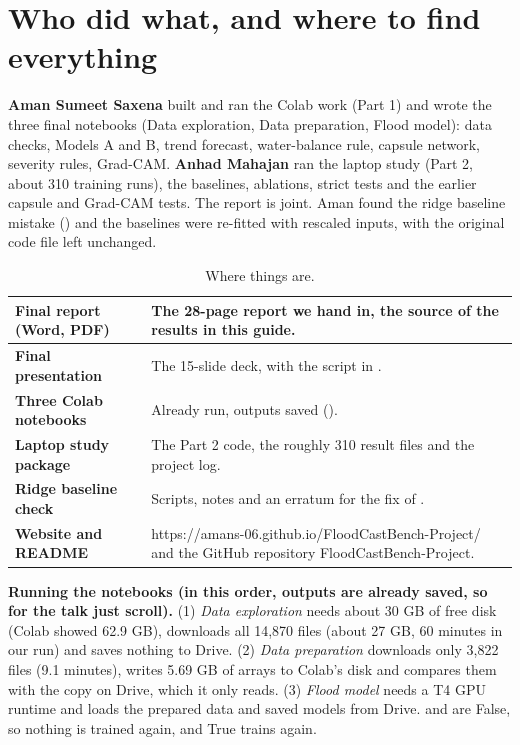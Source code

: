 \section{Who did what, and where to find everything}\label{ch:who}
\textbf{Aman Sumeet Saxena} built and ran the Colab work (Part 1) and wrote the three final notebooks (Data exploration, Data preparation, Flood model): data checks, Models A and B, trend forecast, water-balance rule, capsule network, severity rules, Grad-CAM. \textbf{Anhad Mahajan} ran the laptop study (Part 2, about 310 training runs), the baselines, ablations, strict tests and the earlier capsule and Grad-CAM tests. The report is joint. Aman found the ridge baseline mistake () and the baselines were re-fitted with rescaled inputs, with the original code file left unchanged.

\begin{table}[!htbp]
\centering\footnotesize
\caption{Where things are.}
\begin{tabularx}{\linewidth}{|>{\bfseries}p{3.6cm}|Y|}
\hline
Final report (Word, PDF) & The 28-page report we hand in, the source of the results in this guide.\\ \hline
Final presentation & The 15-slide deck, with the script in .\\ \hline
Three Colab notebooks & Already run, outputs saved ().\\ \hline
Laptop study package & The Part 2 code, the roughly 310 result files and the project log.\\ \hline
Ridge baseline check & Scripts, notes and an erratum for the fix of .\\ \hline
Website and README & https://amans-06.github.io/FloodCastBench-Project/ and the GitHub repository FloodCastBench-Project.\\ \hline
\end{tabularx}
\end{table}

\textbf{Running the notebooks (in this order, outputs are already saved, so for the talk just scroll).} (1) \emph{Data exploration} needs about 30 GB of free disk (Colab showed 62.9 GB), downloads all 14,870 files (about 27 GB, 60 minutes in our run) and saves nothing to Drive. (2) \emph{Data preparation} downloads only 3,822 files (9.1 minutes), writes 5.69 GB of arrays to Colab's disk and compares them with the copy on Drive, which it only reads. (3) \emph{Flood model} needs a T4 GPU runtime and loads the prepared data and saved models from Drive.  and  are False, so nothing is trained again, and True trains again.
